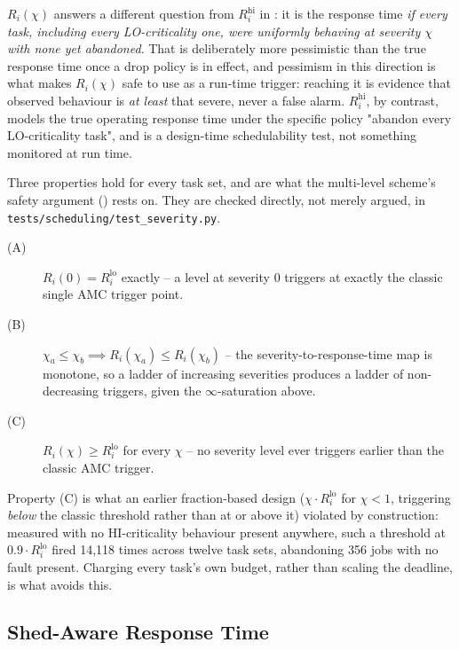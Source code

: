 \documentclass{article}
\begin{document}
$R_i(\chi)$ answers a different question from $R_i^{\mathrm{hi}}$ in
: it is the response time \emph{if every task, including
every LO-criticality one, were uniformly behaving at severity $\chi$ with none
yet abandoned}. That is deliberately more pessimistic than the true response
time once a drop policy is in effect, and pessimism in this direction is what
makes $R_i(\chi)$ safe to use as a run-time trigger: reaching it is evidence
that observed behaviour is \emph{at least} that severe, never a false alarm.
$R_i^{\mathrm{hi}}$, by contrast, models the true operating response time under
the specific policy "abandon every LO-criticality task", and is a design-time
schedulability test, not something monitored at run time.

Three properties hold for every task set, and are what the multi-level
scheme's safety argument () rests on. They are checked
directly, not merely argued, in \texttt{tests/scheduling/test\_severity.py}.

\begin{description}
\item[(A)] $R_i(0) = R_i^{\mathrm{lo}}$ exactly -- a level at severity $0$
  triggers at exactly the classic single AMC trigger point.
\item[(B)] $\chi_a \leq \chi_b \implies R_i(\chi_a) \leq R_i(\chi_b)$ -- the
  severity-to-response-time map is monotone, so a ladder of increasing
  severities produces a ladder of non-decreasing triggers, given the
  $\infty$-saturation above.
\item[(C)] $R_i(\chi) \geq R_i^{\mathrm{lo}}$ for every $\chi$ -- no severity
  level ever triggers earlier than the classic AMC trigger.
\end{description}
\label{prop:c}

Property (C) is what an earlier fraction-based design ($\chi \cdot
R_i^{\mathrm{lo}}$ for $\chi < 1$, triggering \emph{below} the classic
threshold rather than at or above it) violated by construction: measured with
no HI-criticality behaviour present anywhere, such a threshold at $0.9 \cdot
R_i^{\mathrm{lo}}$ fired 14{,}118 times across twelve task sets, abandoning 356
jobs with no fault present. Charging every task's own budget, rather than
scaling the deadline, is what avoids this.

\subsection{Shed-Aware Response Time}
\label{sec:shed-aware}
\end{document}
